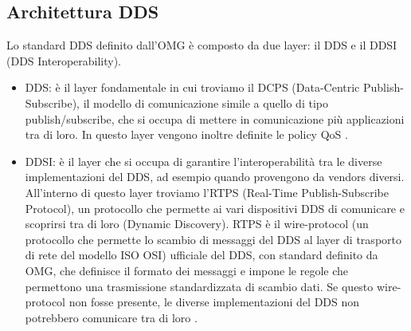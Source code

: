 \subsection{Architettura DDS}
Lo standard DDS definito dall'OMG è composto da due layer: 
il DDS e il
DDSI (DDS Interoperability).
    \begin{itemize}
        \item DDS: è il layer fondamentale in cui troviamo il DCPS
        (Data-Centric Publish-Subscribe),
        il modello di comunicazione simile a quello di tipo publish/subscribe,
        che si occupa di mettere in comunicazione più applicazioni 
        tra di loro. In questo layer vengono inoltre 
        definite le policy QoS \cite{Michaud2017Apr}.
        \item DDSI: è il layer che si occupa di garantire l'interoperabilità
        tra le diverse implementazioni del DDS, ad
        esempio quando provengono da vendors diversi.
        All'interno di questo layer troviamo l'RTPS 
        (Real-Time Publish-Subscribe Protocol), un protocollo che permette ai 
        vari dispositivi DDS di comunicare e scoprirsi tra di loro
        (Dynamic Discovery).
        RTPS è il wire-protocol (un protocollo che permette lo scambio di 
        messaggi del DDS al layer di trasporto di rete 
        del modello ISO OSI) ufficiale del DDS, 
        con standard definito da OMG,
        che definisce il formato dei messaggi e impone le regole che 
        permettono una trasmissione standardizzata di scambio dati. 
        Se questo wire-protocol non fosse presente,
        le diverse implementazioni del DDS non potrebbero 
        comunicare tra di loro \cite{essay93639}.
    \end{itemize} 











